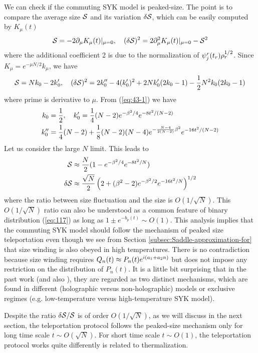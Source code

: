 \documentclass[11pt]{article}
\renewcommand{\>}{\rangle}
\newcommand{\<}{\langle}
\begin{document}
We can check if the commuting SYK model is peaked-size. The point
is to compare the average size $\mathcal{S}$ and its variation $\delta\mathcal{S}$,
which can be easily computed by $K_{\mu}(t)$ 
\begin{equation}
\mathcal{S}=-2\partial_{\mu}K_{\mu}(t)|_{\mu=0},\quad(\delta\mathcal{S})^{2}=2\partial_{\mu}^{2}K_{\mu}(t)|_{\mu=0}-\mathcal{S}^{2}
\end{equation}
where the additional coefficient 2 is due to the normalization of
$\psi_{j}^{r}(t_{r})\rho_{r}^{1/2}$. Since $K_{\mu}=e^{-\mu N/2}k_{\mu}$,
we have
\begin{equation}
\mathcal{S}=Nk_{0}-2k{}_{0}',\quad(\delta\mathcal{S})^{2}=2k_{0}''-4(k_{0}')^{2}+2Nk_{0}'(2k_{0}-1)-\frac{1}{2}N^{2}k_{0}(2k_{0}-1)
\end{equation}
where prime is derivative to $\mu$. From (\ref{eq:43-1}) we
have 
\begin{align}
k_{0} & =\frac{1}{2},\quad k_{0}'=\frac{1}{4}(N-2)e^{-\beta^{2}/4}e^{-8t^{2}/(N-2)}\\
k_{0}'' & =\frac{1}{4}(N-2)+\frac{1}{8}(N-2)(N-4)e^{-\frac{N-4}{2(N-2)}\beta^{2}}e^{-16t^{2}/(N-2)}
\end{align}
Let us consider the large $N$ limit. This leads to
\begin{align}
\mathcal{S} & \approx\frac{N}{2}(1-e^{-\beta^{2}/4}e^{-8t^{2}/N}) \label{eq:3.57}\\
\delta\mathcal{S} & \approx\frac{\sqrt{N}}{2}\left(2+(\beta^{2}-2)e^{-\beta^{2}/2}e^{-16t^{2}/N}\right)^{1/2}
\end{align}
where the ratio between size fluctuation and the size is $O(1/\sqrt{N})$.
This $O(1/\sqrt{N})$ ratio can also be understood as a common feature
of binary distribution (\ref{eq:117}) as long as $1\pm e^{-b_{p}(t)}\sim O(1)$.
This analysis implies that the commuting SYK model should follow the mechanism of peaked
size teleportation even though we see from
Section \ref{subsec:Saddle-approximation-for} that size winding is
also obeyed in high temperatures. There is no contradiction because
size winding requires $Q_{n}(t)\approx P_{n}(t)e^{i(a_{1}+a_{2}n)}$
but does not impose any restriction on the distribution of $P_{n}(t)$.
It is a little bit surprising that in the past work \cite{Schuster:2021uvg} (and
also \cite{Brown:2019hmk, Nezami:2021yaq}), they are regarded as two distinct mechanisms, which are found in different (holographic versus non-holographic) models or exclusive regimes (e.g. low-temperature versus high-temperature SYK model).

Despite the ratio $\delta\mathcal{S}/\mathcal{S}$ is of order $O(1/\sqrt{N})$, as we
will discuss in the next section, the teleportation protocol follows
the peaked-size mechanism only for long time scale $t\sim O(\sqrt{N})$.
For short time scale $t\sim O(1)$, the teleportation protocol works
quite differently is related to thermalization.
\end{document}
